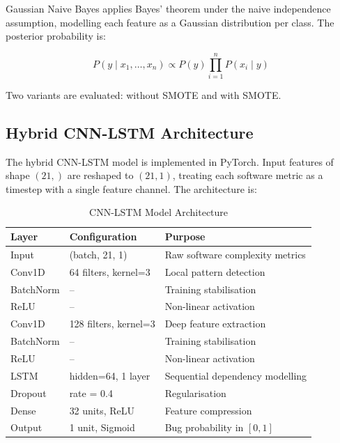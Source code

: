 \documentclass[12pt,a4paper,oneside]{report}
\begin{document}
Gaussian Naive Bayes applies Bayes' theorem under the naive independence assumption, modelling each feature as a Gaussian distribution per class. The posterior probability is:

\begin{equation}
  P(y \mid x_1, \ldots, x_n) \propto P(y) \prod_{i=1}^{n} P(x_i \mid y)
  \label{eq:nb}
\end{equation}

Two variants are evaluated: without SMOTE and with SMOTE.

\subsection{Hybrid CNN-LSTM Architecture}

The hybrid CNN-LSTM model is implemented in PyTorch. Input features of shape $(21,)$ are reshaped to $(21, 1)$, treating each software metric as a timestep with a single feature channel. The architecture is:

\begin{table}[H]
  \centering
  \caption{CNN-LSTM Model Architecture}
  \label{tab:cnn_lstm_arch}
  \begin{tabular}{L{28mm}L{50mm}L{65mm}}
    \toprule
    \textbf{Layer} & \textbf{Configuration} & \textbf{Purpose} \\
    \midrule
    Input       & (batch, 21, 1)            & Raw software complexity metrics \\
    Conv1D      & 64 filters, kernel=3      & Local pattern detection \\
    BatchNorm   & --                         & Training stabilisation \\
    ReLU        & --                         & Non-linear activation \\
    Conv1D      & 128 filters, kernel=3     & Deep feature extraction \\
    BatchNorm   & --                         & Training stabilisation \\
    ReLU        & --                         & Non-linear activation \\
    LSTM        & hidden=64, 1 layer        & Sequential dependency modelling \\
    Dropout     & rate = 0.4                & Regularisation \\
    Dense       & 32 units, ReLU            & Feature compression \\
    Output      & 1 unit, Sigmoid           & Bug probability in $[0, 1]$ \\
    \bottomrule
  \end{tabular}
\end{table}
\end{document}
